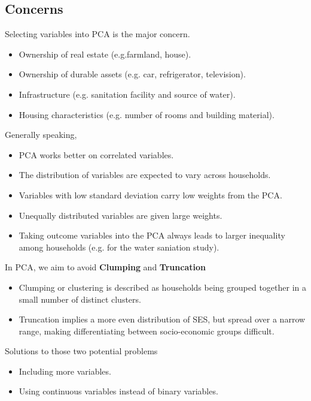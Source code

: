 \documentclass[13pt]{beamer}
\begin{document}
\subsection{Concerns}
\begin{frame}
	Selecting variables into PCA is the major concern.
	\begin{itemize}
		\item Ownership of real estate (e.g.farmland, house).
		\item Ownership of durable assets (e.g. car, refrigerator, television).
		\item Infrastructure (e.g. sanitation facility and source of water).
		\item Housing characteristics (e.g. number of rooms and building material).
	\end{itemize}
	Generally speaking,
	\begin{itemize}
		\item PCA works better on correlated variables.
		\item The distribution of variables are expected to vary across households.
		\item Variables with low standard deviation carry low weights from the PCA.
		\item Unequally distributed variables are given large weights.
		\item Taking outcome variables into the PCA always leads to larger inequality among households (e.g. for the water saniation study).   
	\end{itemize}
\end{frame}
\begin{frame}
	In PCA, we aim to avoid \textbf{Clumping} and \textbf{Truncation}
	\begin{itemize}
		\item Clumping or clustering is	described as households being grouped together in a small number of distinct clusters.
		\item Truncation implies a more even distribution of SES, but spread over a narrow range, making differentiating between socio-economic groups difficult.
	\end{itemize}
	Solutions to those two potential problems
	\begin{itemize}
		\item Including more variables.
		\item Using continuous variables instead of binary variables.
	\end{itemize}
\end{frame}
\end{document}
